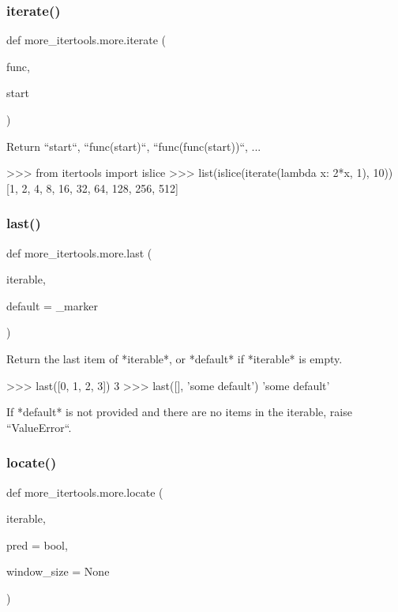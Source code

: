 \subsubsection{\texorpdfstring{iterate()}{iterate()}}
{\footnotesize\ttfamily def more\+\_\+itertools.\+more.\+iterate (\begin{DoxyParamCaption}\item[{}]{func,  }\item[{}]{start }\end{DoxyParamCaption})}

\begin{DoxyVerb}Return ``start``, ``func(start)``, ``func(func(start))``, ...

    >>> from itertools import islice
    >>> list(islice(iterate(lambda x: 2*x, 1), 10))
    [1, 2, 4, 8, 16, 32, 64, 128, 256, 512]\end{DoxyVerb}
 \mbox{\label{namespacemore__itertools_1_1more_a45c76219dda8923e65c5c2ce77cb0eaa}} 
\subsubsection{\texorpdfstring{last()}{last()}}
{\footnotesize\ttfamily def more\+\_\+itertools.\+more.\+last (\begin{DoxyParamCaption}\item[{}]{iterable,  }\item[{}]{default = {\ttfamily \+\_\+marker} }\end{DoxyParamCaption})}

\begin{DoxyVerb}Return the last item of *iterable*, or *default* if *iterable* is
empty.

    >>> last([0, 1, 2, 3])
    3
    >>> last([], 'some default')
    'some default'

If *default* is not provided and there are no items in the iterable,
raise ``ValueError``.
\end{DoxyVerb}
 \mbox{\label{namespacemore__itertools_1_1more_a6205759d80f372f3fb3b9563755176f1}} 
\subsubsection{\texorpdfstring{locate()}{locate()}}
{\footnotesize\ttfamily def more\+\_\+itertools.\+more.\+locate (\begin{DoxyParamCaption}\item[{}]{iterable,  }\item[{}]{pred = {\ttfamily bool},  }\item[{}]{window\+\_\+size = {\ttfamily None} }\end{DoxyParamCaption})}

